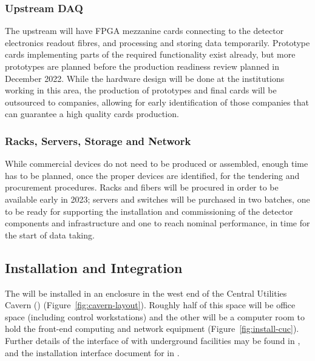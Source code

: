 \subsubsection{Upstream DAQ}
The upstream  will have FPGA mezzanine cards connecting to the detector electronics readout fibres, and processing and storing data temporarily. Prototype cards implementing parts of the required functionality exist already, but more prototypes are planned before the production readiness review planned in December 2022. While the hardware design will be done at the institutions working in this area, the production of prototypes and final cards will be outsourced to companies, allowing for early identification of those companies that can guarantee a high quality cards production.

\subsubsection{Racks, Servers, Storage and Network}
While commercial devices do not need to be produced or assembled, enough time has to be planned, once the proper devices are identified, for the tendering and procurement procedures. Racks and fibers will be procured in order to be available early in 2023; servers and switches will be purchased in two batches, one to be ready for supporting the installation and commissioning of the detector components and  infrastructure and one to reach nominal performance, in time for the start of data taking.

\subsection{Installation and Integration}


The  will be installed in an enclosure in the west end of the Central
Utilities Cavern () (Figure~\ref{fig:cavern-layout}).  Roughly
half of this space will be office space (including control
workstations) and the other will be a computer room to hold the 
front-end computing and network equipment (Figure~\ref{fig:install-cuc}). Further details of the interface of  with underground facilities
may be found in , and the installation interface document for  in .

